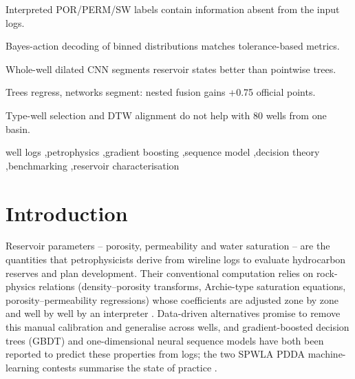 \documentclass[preprint,12pt]{elsarticle}
\begin{document}
\begin{frontmatter}
\begin{highlights}
\item Interpreted POR/PERM/SW labels contain information absent from the input logs.
\item Bayes-action decoding of binned distributions matches tolerance-based metrics.
\item Whole-well dilated CNN segments reservoir states better than pointwise trees.
\item Trees regress, networks segment: nested fusion gains +0.75 official points.
\item Type-well selection and DTW alignment do not help with 80 wells from one basin.
\end{highlights}

\begin{keyword}
well logs \sep petrophysics \sep gradient boosting \sep sequence model \sep decision theory \sep benchmarking \sep reservoir characterisation
\end{keyword}

\end{frontmatter}

\linenumbers

\section{Introduction}
\label{sec:intro}

Reservoir parameters -- porosity, permeability and water saturation -- are the quantities that petrophysicists derive from wireline logs to evaluate hydrocarbon reserves and plan development. Their conventional computation relies on rock-physics relations (density--porosity transforms, Archie-type saturation equations, porosity--permeability regressions) whose coefficients are adjusted zone by zone and well by well by an interpreter \cite{archie1942}. Data-driven alternatives promise to remove this manual calibration and generalise across wells, and gradient-boosted decision trees (GBDT) and one-dimensional neural sequence models have both been reported to predict these properties from logs; the two SPWLA PDDA machine-learning contests summarise the state of practice \cite{yu2021sonic,fu2024contest}.
\end{document}
